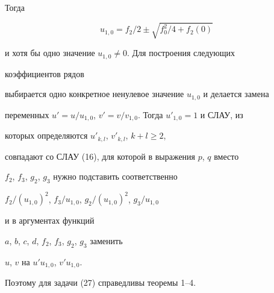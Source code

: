 Тогда


$$


u_{1,0}=f_2/2\pm\sqrt{f^2_0/4+f_2(0)}


$$


и хотя бы одно значение $u_{1,0}\ne 0$. Для построения следующих


коэффициентов рядов


выбирается одно конкретное ненулевое значение $u_{1,0}$ и делается замена


переменных $u'=u/u_{1,0}$, $v'=v/v_{1,0}$. Тогда $u'_{1,0}=1$ и СЛАУ, из


которых определяются $u'_{k,l}$, $v'_{k,l}$, $k+l\ge 2$,


совпадают со СЛАУ (16), для которой в выражения $p$, $q$ вместо


$f_2$, $f_3$, $g_2$, $g_3$ нужно подставить соответственно


$f_2/(u_{1,0})^2$, $f_3/u_{1,0}$, $g_2/(u_{1,0})^2$, $g_3/u_{1,0}$


и в аргументах функций


$a$, $b$, $c$, $d$, $f_2$, $f_3$, $g_2$, $g_3$ заменить


$u$, $v$ на $u'u_{1,0}$, $v'u_{1,0}$.


Поэтому для задачи (27) справедливы теоремы 1--4.





